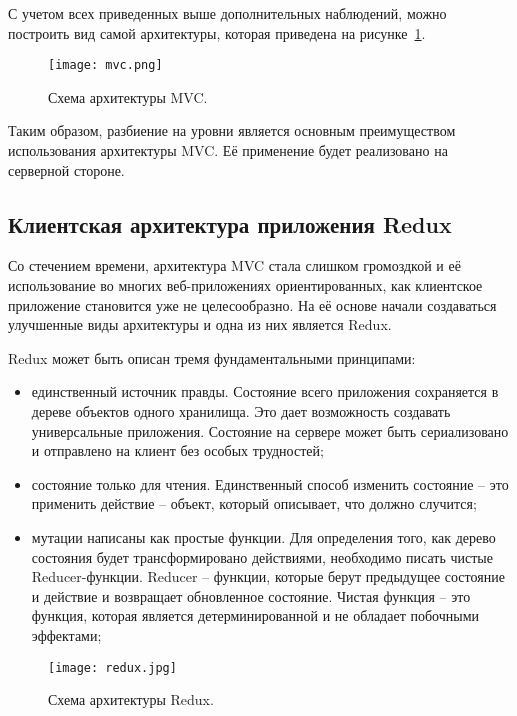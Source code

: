 С учетом всех приведенных выше дополнительных наблюдений, можно построить вид самой архитектуры, которая приведена на рисунке~\ref{fig:domain:manual_structure:credit_net}.

\begin{figure}[ht]
\centering
  \texttt{[image: mvc.png]}  
  \caption{ Схема архитектуры MVC. }
  \label{fig:domain:manual_structure:credit_net}
\end{figure}

Таким образом, разбиение на уровни является основным преимуществом использования архитектуры MVC. Её применение будет реализовано на серверной стороне.


\subsection{Клиентская архитектура приложения Redux}
\label{sub:domain:learning_complexity}

Со стечением времени, архитектура MVC стала слишком громоздкой и её использование во многих веб-приложениях ориентированных, как клиентское приложение становится уже не целесообразно. На её основе начали создаваться улучшенные виды архитектуры и одна из них является Redux.

Redux может быть описан тремя фундаментальными принципами:
 
\begin{itemize}
  \item единственный источник правды. Состояние всего приложения сохраняется в дереве объектов одного хранилища. Это дает возможность создавать универсальные приложения. Состояние на сервере может быть сериализовано и отправлено на клиент без особых трудностей;
  \item состояние только для чтения. Единственный способ изменить состояние – это применить действие – объект, который описывает, что должно случится;
  \item мутации написаны как простые функции. Для определения того, как дерево состояния будет трансформировано действиями, необходимо писать чистые Reducer-функции. Reducer – функции, которые берут предыдущее состояние и действие и возвращает обновленное состояние. Чистая функция – это функция, которая является детерминированной и не обладает побочными эффектами;
\end{itemize}

\begin{figure}[ht]
\centering
  \texttt{[image: redux.jpg]}  
  \caption{ Схема архитектуры Redux. }
  \label{fig:domain:manual_structure:credit_redux}
\end{figure}

